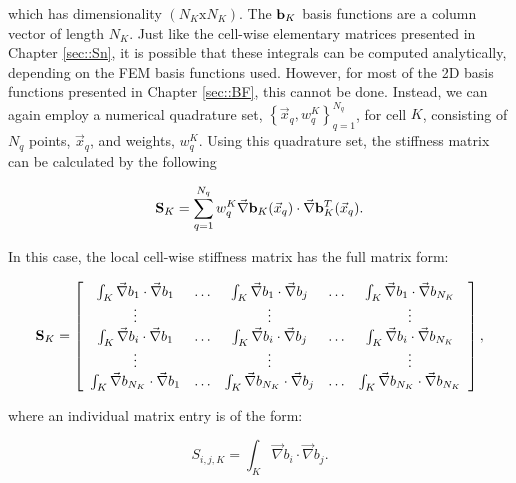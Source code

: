 \noindent which has dimensionality $(N_K \text{x} N_K)$. The ${\bf b}_K$ basis functions are a column vector of length $N_K$. Just like the cell-wise elementary matrices presented in Chapter \ref{sec::Sn}, it is possible that these integrals can be computed analytically, depending on the FEM basis functions used. However, for most of the 2D basis functions presented in Chapter \ref{sec::BF}, this cannot be done. Instead, we can again employ a numerical quadrature set, $\left\{  \vec{x}_q , w_q^{K}  \right\}_{q=1}^{N_q}$, for cell $K$, consisting of $N_q$ points, $\vec{x}_q$, and weights, $w_q^K$. Using this quadrature set, the stiffness matrix can be calculated by the following

\begin{equation}
\label{eq::DSA_stiffness_matrix_numerical}
{\bf S}_K = \sum_{q = 1}^{N_q} w_{q}^K \vec{\nabla} {\bf b}_K (\vec{x}_q) \cdot  \vec{\nabla}{\bf b}_K^T (\vec{x}_q)  .
\end{equation}

\noindent In this case, the local cell-wise stiffness matrix has the full matrix form:

\begin{equation}
\label{eq::DSA_stiffness_matrix_array}
{\bf S}_K =   \left[
\begin{array} {ccccc}
	\int_K \vec{\nabla}b_1 \cdot \vec{\nabla} b_1  & \ldots & \int_K \vec{\nabla}b_1 \cdot \vec{\nabla} b_j  & \ldots & \int_K \vec{\nabla}b_1 \cdot \vec{\nabla}b_{N_K} \\
	\vdots  &  & \vdots  &  & \vdots \\
	\int_K \vec{\nabla} b_i \cdot \vec{\nabla} b_1  & \ldots & \int_K \vec{\nabla}b_i \cdot \vec{\nabla} b_j  & \ldots & \int_K \vec{\nabla}b_i \cdot \vec{\nabla}b_{N_K} \\
	\vdots  &  & \vdots  &  & \vdots \\
	\int_K \vec{\nabla} b_{N_K}\cdot \vec{\nabla} b_1  & \ldots & \int_K \vec{\nabla} b_{N_K}\cdot \vec{\nabla} b_j  & \ldots & \int_K \vec{\nabla} b_{N_K} \cdot \vec{\nabla} b_{N_K} \\
\end{array}
\right] ,
\end{equation}

\noindent where an individual matrix entry is of the form:

\begin{equation}
\label{eq::DSA_stiffness_matrix_entry}
S_{i,j,K} =  \int_K \vec{\nabla}b_i \cdot \vec{\nabla} b_j .
\end{equation}


